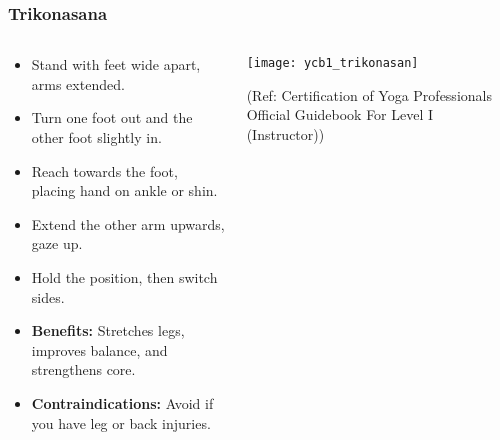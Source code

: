\begin{frame}[fragile]\frametitle{Trikonasana}
\begin{columns}
    \begin{column}[T]{0.5\linewidth}
      \begin{itemize}
        \item Stand with feet wide apart, arms extended.
        \item Turn one foot out and the other foot slightly in.
        \item Reach towards the foot, placing hand on ankle or shin.
        \item Extend the other arm upwards, gaze up.
        \item Hold the position, then switch sides.
        \item \textbf{Benefits:} Stretches legs, improves balance, and strengthens core.
        \item \textbf{Contraindications:} Avoid if you have leg or back injuries.
      \end{itemize}
    \end{column}
    \begin{column}[T]{0.5\linewidth}
        \begin{center}
        \begin{center}
		        \texttt{[image: ycb1\_trikonasan]}
				
				{\tiny (Ref: Certification  of Yoga Professionals Official Guidebook For Level I (Instructor))}	        
		\end{center}   
        \end{center}    
    \end{column}
  \end{columns}
\end{frame}

